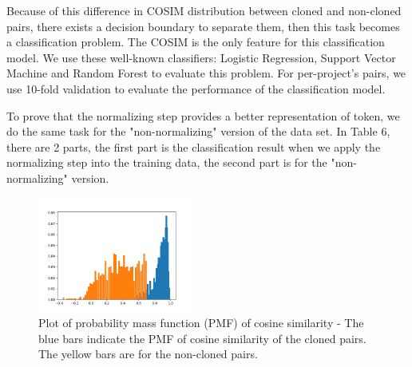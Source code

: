 Because of this difference in COSIM distribution between cloned and non-cloned pairs, there exists a decision boundary to separate them, then this task becomes a classification problem. The COSIM is the only feature for this classification model. We use these well-known classifiers: Logistic Regression, Support Vector Machine and Random Forest to evaluate this problem. For per-project's pairs, we use 10-fold validation to evaluate the performance of the classification model.

To prove that the normalizing step provides a better representation of token, we do the same task for the "non-normalizing" version of the data set. In Table 6, there are 2 parts, the first part is the classification result when we apply the normalizing step into the training data, the second part is for the "non-normalizing" version.


\begin{figure}[t!]
	\includegraphics[width=0.45\textwidth]{clone_distribution}
	\caption{Plot of probability mass function (PMF) of cosine similarity - The blue bars indicate the PMF of cosine similarity of the cloned pairs. The yellow bars are for the non-cloned pairs.}
	\label{fig:clf}
\end{figure}


